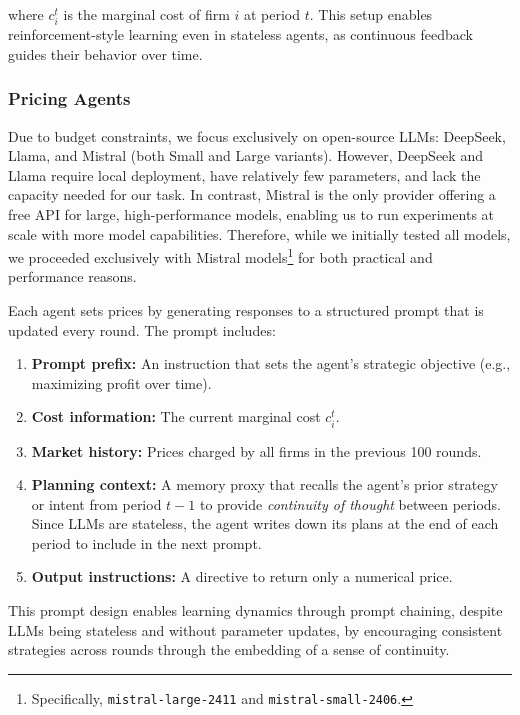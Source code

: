 where $c_i^t$ is the marginal cost of firm $i$ at period $t$. This setup enables reinforcement-style learning even in stateless agents, as continuous feedback guides their behavior over time.

\subsubsection*{Pricing Agents}

Due to budget constraints, we focus exclusively on open-source LLMs: DeepSeek, Llama, and Mistral (both Small and Large variants). However, DeepSeek and Llama require local deployment, have relatively few parameters, and lack the capacity needed for our task. In contrast, Mistral is the only provider offering a free API for large, high-performance models, enabling us to run experiments at scale with more model capabilities. Therefore, while we initially tested all models, we proceeded exclusively with Mistral models\footnote{Specifically, \texttt{mistral-large-2411} and \texttt{mistral-small-2406}.} for both practical and performance reasons.

Each agent sets prices by generating responses to a structured prompt that is updated every round. The prompt includes:
\begin{enumerate}[noitemsep]
    \item \textbf{Prompt prefix:} An instruction that sets the agent's strategic objective (e.g., maximizing profit over time).
    \item \textbf{Cost information:} The current marginal cost $c_i^t$.
    \item \textbf{Market history:} Prices charged by all firms in the previous 100 rounds.
    \item \textbf{Planning context:} A memory proxy that recalls the agent's prior strategy or intent from period $t-1$ to provide \emph{continuity of thought} between periods. Since LLMs are stateless, the agent writes down its plans at the end of each period to include in the next prompt.
    \item \textbf{Output instructions:} A directive to return only a numerical price.
\end{enumerate}

This prompt design enables learning dynamics through prompt chaining, despite LLMs being stateless and without parameter updates, by encouraging consistent strategies across rounds through the embedding of a sense of continuity.

